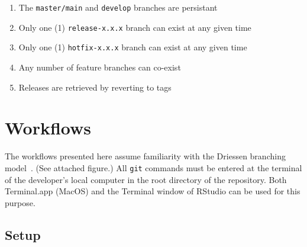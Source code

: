 \documentclass{article}
\begin{document}
\begin{enumerate}

  \item The \texttt{master/main} and \texttt{develop} branches are persistant
  
  \item Only one (1) \texttt{release-x.x.x} branch can exist at any given time

  \item Only one (1) \texttt{hotfix-x.x.x} branch can exist at any given time
  
  \item Any number of feature branches can co-exist
  
  \item Releases are retrieved by reverting to tags

\end{enumerate}


\section{Workflows} 
\label{sec:workflows}

The workflows presented here assume familiarity 
with the Driessen branching model~\cite{Driessen:2010}. 
(See attached figure.)
All \texttt{git} commands must be entered 
at the terminal of the developer's local computer
in the root directory of the repository.
Both Terminal.app (MacOS) and the Terminal window of RStudio
can be used for this purpose.


\subsection{Setup} 
\label{sec:setup}
\end{document}
